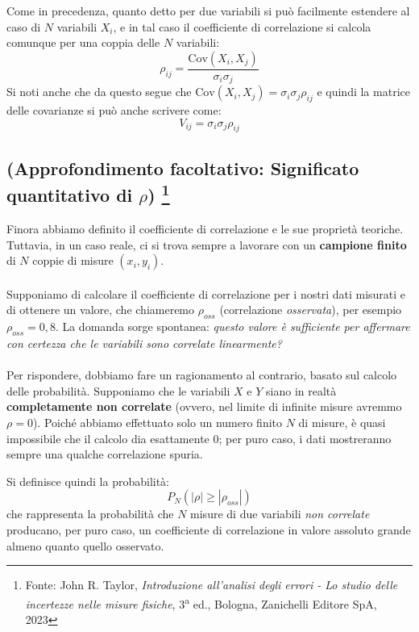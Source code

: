 \documentclass[openany,a4paper,12pt]{book}
\theoremstyle{remark}
\begin{document}
Come in precedenza, quanto detto per due variabili si può facilmente estendere al caso di $N$ variabili $X_i$, e in tal caso il coefficiente di correlazione si calcola comunque per una coppia delle $N$ variabili:
\begin{equation}
    \rho_{ij} = \frac{\text{Cov}(X_i, X_j)}{\sigma_i \sigma_j}
\end{equation}
Si noti anche che da questo segue che $\text{Cov}(X_i, X_j) = \sigma_i \sigma_j \rho_{ij}$ e quindi la matrice delle covarianze si può anche scrivere come:
\begin{equation}
    V_{ij} = \sigma_i \sigma_j \rho_{ij}
\end{equation}

\subsection*{(Approfondimento facoltativo: Significato quantitativo di $\rho$) \footnote{Fonte: John R. Taylor, \textit{Introduzione all'analisi degli errori - Lo studio delle incertezze nelle misure fisiche}, 3\textsuperscript{a} ed., Bologna, Zanichelli Editore SpA, 2023}}



Finora abbiamo definito il coefficiente di correlazione e le sue proprietà teoriche. Tuttavia, in un caso reale, ci si trova sempre a lavorare con un \textbf{campione finito} di $N$ coppie di misure $(x_i, y_i)$. 
\\
\\
Supponiamo di calcolare il coefficiente di correlazione per i nostri dati misurati e di ottenere un valore, che chiameremo $\rho_{oss}$ (correlazione \textit{osservata}), per esempio $\rho_{oss} = 0,8$. La domanda sorge spontanea: \textit{questo valore è sufficiente per affermare con certezza che le variabili sono correlate linearmente?}
\\
\\
Per rispondere, dobbiamo fare un ragionamento al contrario, basato sul calcolo delle probabilità. Supponiamo che le variabili $X$ e $Y$ siano in realtà \textbf{completamente non correlate} (ovvero, nel limite di infinite misure avremmo $\rho = 0$). Poiché abbiamo effettuato solo un numero finito $N$ di misure, è quasi impossibile che il calcolo dia esattamente $0$; per puro caso, i dati mostreranno sempre una qualche correlazione spuria. 

Si definisce quindi la probabilità:
\begin{equation}
    P_N(|\rho| \ge |\rho_{oss}|)
\end{equation}
che rappresenta la probabilità che $N$ misure di due variabili \textit{non correlate} producano, per puro caso, un coefficiente di correlazione in valore assoluto grande almeno quanto quello osservato. 
\end{document}
